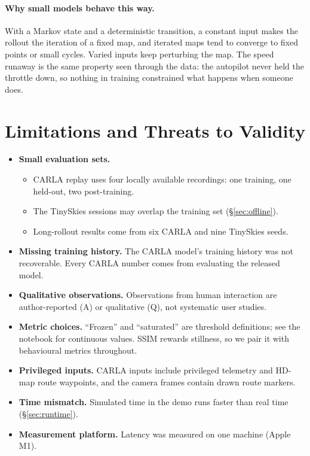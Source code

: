 \documentclass[11pt]{article}
\begin{document}
\paragraph{Why small models behave this way.} With a Markov state and a deterministic transition, a constant input makes the rollout the iteration of a fixed map, and iterated maps tend to converge to fixed points or small cycles. Varied inputs keep perturbing the map. The speed runaway is the same property seen through the data: the autopilot never held the throttle down, so nothing in training constrained what happens when someone does.

\section{Limitations and Threats to Validity}
\label{sec:limitations}

\begin{itemize}
  \item \textbf{Small evaluation sets.}
  \begin{itemize}
    \item CARLA replay uses four locally available recordings: one training, one held-out, two post-training.
    \item The TinySkies sessions may overlap the training set (\S\ref{sec:offline}).
    \item Long-rollout results come from six CARLA and nine TinySkies seeds.
  \end{itemize}
  \item \textbf{Missing training history.} The CARLA model's training history was not recoverable. Every CARLA number comes from evaluating the released model.
  \item \textbf{Qualitative observations.} Observations from human interaction are author-reported (A) or qualitative (Q), not systematic user studies.
  \item \textbf{Metric choices.} ``Frozen'' and ``saturated'' are threshold definitions; see the notebook for continuous values. SSIM rewards stillness, so we pair it with behavioural metrics throughout.
  \item \textbf{Privileged inputs.} CARLA inputs include privileged telemetry and HD-map route waypoints, and the camera frames contain drawn route markers.
  \item \textbf{Time mismatch.} Simulated time in the demo runs faster than real time (\S\ref{sec:runtime}).
  \item \textbf{Measurement platform.} Latency was measured on one machine (Apple M1).
\end{itemize}
\end{document}
